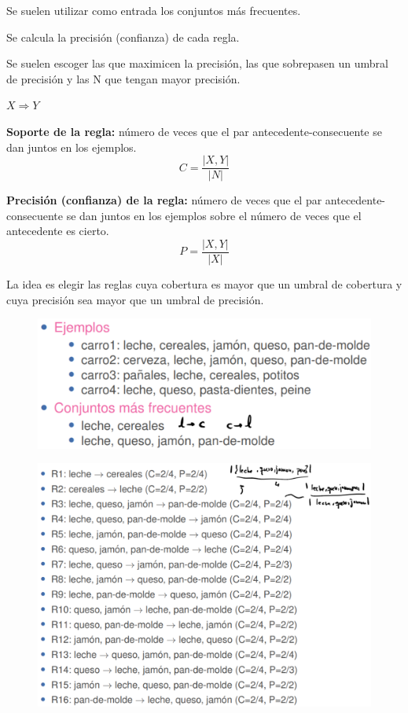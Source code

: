 \documentclass[12pt]{report} %
\begin{document}
Se suelen utilizar como entrada los conjuntos más frecuentes.

Se calcula la precisión (confianza) de cada regla.

Se suelen escoger las que maximicen la precisión, las que sobrepasen un umbral de precisión y las N que tengan mayor precisión.

\begin{center}
  $X \Rightarrow Y$
\end{center}

\textbf{Soporte de la regla:} número de veces que el par antecedente-consecuente se dan juntos en los ejemplos.
$$C = \frac{|X, Y|}{|N|}$$

\textbf{Precisión (confianza) de la regla:} número de veces que el par antecedente-consecuente se dan juntos en los ejemplos sobre el número de veces que el antecedente es cierto.
$$P = \frac{|X, Y|}{|X|}$$

La idea es elegir las reglas cuya cobertura es mayor que un umbral de cobertura y cuya precisión sea mayor que un umbral de precisión.

\begin{figure}[H]
  {\includegraphics[scale=.3]{2021-04-10 01_17_45-ensembles-reglasAsociacion.pdf - Foxit Reader.png}}
\end{figure}

\begin{figure}[H]
  {\includegraphics[scale=.3]{2021-04-10 01_18_02-ensembles-reglasAsociacion.pdf - Foxit Reader.png}}
\end{figure}
\end{document}
